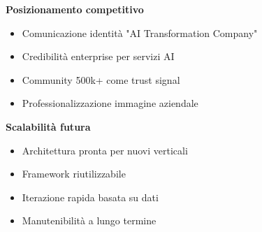 \textbf{Posizionamento competitivo}
\begin{itemize}
  \item Comunicazione identità "AI Transformation Company"
  \item Credibilità enterprise per servizi AI
  \item Community 500k+ come trust signal
  \item Professionalizzazione immagine aziendale
\end{itemize}

\textbf{Scalabilità futura}
\begin{itemize}
  \item Architettura pronta per nuovi verticali
  \item Framework riutilizzabile
  \item Iterazione rapida basata su dati
  \item Manutenibilità a lungo termine
\end{itemize}